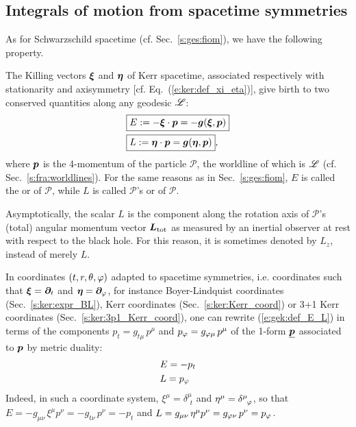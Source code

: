 \subsection{Integrals of motion from spacetime symmetries} \label{s:gek:int_motion_sym}

As for Schwarzschild spacetime (cf. Sec.~\ref{s:ges:fiom}), we have the following
property.
\begin{greybox}
The Killing vectors $\bm{\xi}$ and $\bm{\eta}$ of Kerr spacetime,
associated respectively with
stationarity and axisymmetry [cf. Eq.~(\ref{e:ker:def_xi_eta})],
give birth to two conserved quantities
along any geodesic $\mathscr{L}$:
\begin{subequations}
\label{e:gek:def_E_L}
\begin{align}
& \fbox{$\displaystyle E := - \bm{\xi}\cdot \bm{p} = - \bm{g}(\bm{\xi},\bm{p}) $} \label{e:gek:def_E} \\
& \fbox{$\displaystyle L := \bm{\eta}\cdot \bm{p} = \bm{g}(\bm{\eta},\bm{p}) $} , \label{e:gek:def_L}
\end{align}
\end{subequations}
where $\bm{p}$ is the 4-momentum of the particle $\mathscr{P}$, the worldline of which is $\mathscr{L}$ (cf. Sec.~\ref{s:fra:worldlines}).
For the same reasons as in Sec.~\ref{s:ges:fiom}, $E$ is called
the 
or  of $\mathscr{P}$,
while $L$ is called $\mathscr{P}$'s 
or 
of $\mathscr{P}$.
\end{greybox}
\begin{remark}
Asymptotically, the scalar $L$ is the
component along the rotation axis of $\mathscr{P}$'s (total) angular momentum vector $\bm{L}_{\rm tot}$
as measured by an inertial observer at rest with respect to the black hole.
For this reason, it is sometimes denoted by $L_z$, instead of merely $L$.
\end{remark}

In coordinates $(t,r,\theta,\varphi)$ adapted to spacetime symmetries,
i.e. coordinates such that $\bm{\xi} = \bm{\partial}_t$ and $\bm{\eta}=\bm{\partial}_\varphi$,
for instance Boyer-Lindquist coordinates (Sec.~\ref{s:ker:expr_BL}),
Kerr coordinates (Sec.~\ref{s:ker:Kerr_coord}) or 3+1 Kerr coordinates
(Sec.~\ref{s:ker:3p1_Kerr_coord}), one can rewrite
(\ref{e:gek:def_E_L})
in terms of the components $p_t = g_{t\mu} \, p^\mu$ and $p_\varphi = g_{\varphi\mu} \, p^\mu$
of the 1-form $\underline{\bm{p}}$ associated to $\bm{p}$ by metric duality:
\begin{subequations}
\label{e:gek:E_pt_L_pph}
\begin{align}
& E = - p_t \\
& L = p_\varphi
\end{align}
\end{subequations}
Indeed, in such a coordinate system, $\xi^\mu =  \delta^\mu_{\ \, t}$
and $\eta^\mu = \delta^\mu_{\ \, \varphi}$, so that $E = -g_{\mu\nu} \, \xi^\mu p^\nu = -g_{t\nu} \, p^\nu = -p_t$
and $L = g_{\mu\nu} \, \eta^\mu p^\nu = g_{\varphi\nu} \, p^\nu = p_\varphi$.

